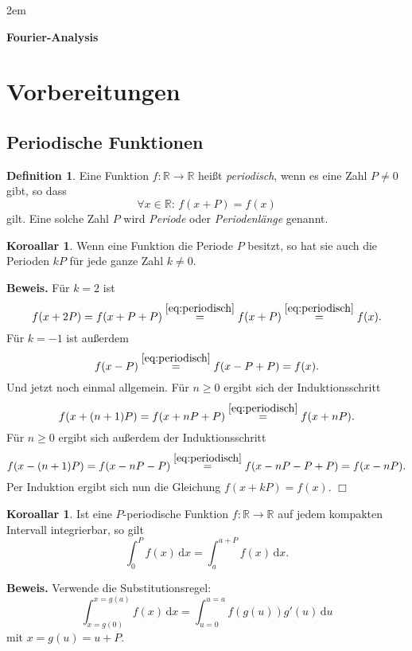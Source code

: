 \documentclass[a4paper,11pt,fleqn,twoside,dvipdfmx]{article}
\newcommand{\R}{\mathbb R}
\newcommand{\emdef}[1]{\emph{#1}}
\theoremstyle{definition}
\newtheorem{Definition}{Definition}
\theoremstyle{theorem}
\newtheorem{Korollar}[Satz]{Koroallar}
\numberwithin{equation}{section}
\begin{document}
\thispagestyle{empty}

\vglue 2em
{\center\LARGE\bfseries Fourier-Analysis\par}

\tableofcontents

\section{Vorbereitungen}
\subsection{Periodische Funktionen}

\begin{Definition}
Eine Funktion $f\colon\R\to\R$ heißt \emdef{periodisch}, wenn es eine
Zahl $P\ne 0$ gibt, so dass
\begin{equation}\label{eq:periodisch}
\forall x\in\R\colon\, f(x+P)=f(x)
\end{equation}
gilt. Eine solche Zahl $P$ wird \emdef{Periode} oder
\emdef{Periodenlänge} genannt.
\end{Definition}

\begin{Korollar}
Wenn eine Funktion die Periode $P$ besitzt, so hat sie auch die
Perioden $kP$ für jede ganze Zahl $k\ne 0$.
\end{Korollar}
\noindent
\textbf{Beweis.} Für $k=2$ ist
\begin{equation}
f(x+2P) = f(x+P+P) \stackrel{\eqref{eq:periodisch}}=
f(x+P) \stackrel{\eqref{eq:periodisch}}= f(x).
\end{equation}
Für $k=-1$ ist außerdem
\begin{equation}
f(x-P) \stackrel{\eqref{eq:periodisch}}= f(x-P+P) = f(x).
\end{equation}
Und jetzt noch einmal allgemein. Für $n\ge 0$ ergibt sich der
Induktionsschritt
\begin{equation}
f(x+(n+1)P) = f(x+nP+P) \stackrel{\eqref{eq:periodisch}}= f(x+nP).
\end{equation}
Für $n\ge 0$ ergibt sich außerdem der Induktionsschritt
\begin{equation}
f(x-(n+1)P) = f(x-nP-P) \stackrel{\eqref{eq:periodisch}}=
f(x-nP-P+P) = f(x-nP).
\end{equation}
Per Induktion ergibt sich nun die Gleichung $f(x+kP) = f(x)$. $\Box$

\begin{Korollar}
Ist eine $P$-periodische Funktion $f\colon\R\to\R$ auf jedem
kompakten Intervall integrierbar, so gilt
\begin{equation}
\int_0^P f(x)\,\mathrm dx = \int_a^{a+P} f(x)\,\mathrm dx.
\end{equation}
\end{Korollar}
\noindent
\textbf{Beweis.} Verwende die Substitutionsregel:
\begin{equation}
\int_{x=g(0)}^{x=g(a)} f(x)\,\mathrm dx = \int_{u=0}^{u=a}
f(g(u))g'(u)\,\mathrm du
\end{equation}
mit $x=g(u)=u+P$.
\end{document}
